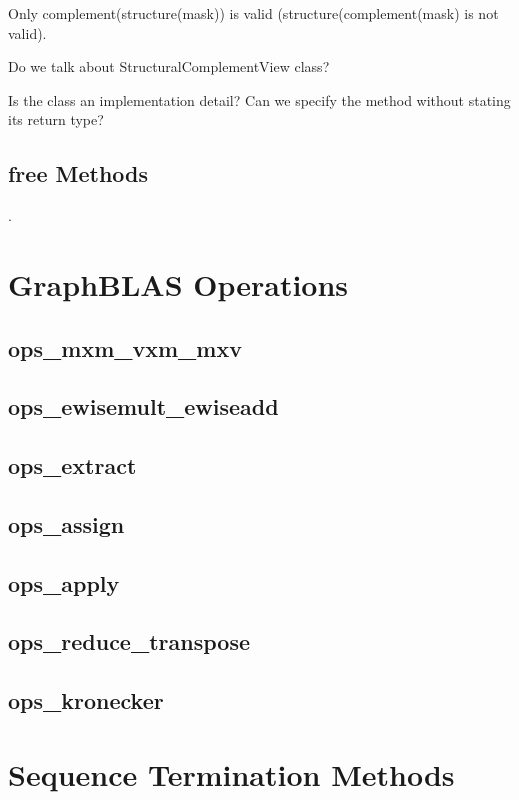 Only complement(structure(mask)) is valid  (structure(complement(mask) is not valid).

Do we talk about StructuralComplementView class?

Is the class an implementation detail?  Can we specify the method without stating its return type?

\subsection{{\sf free} Methods}

.

\section{GraphBLAS Operations}

\subsection{ops\_mxm\_vxm\_mxv}
\subsection{ops\_ewisemult\_ewiseadd}
\subsection{ops\_extract}
\subsection{ops\_assign} 
\subsection{ops\_apply}
\subsection{ops\_reduce\_transpose}
\subsection{ops\_kronecker}

\section{Sequence Termination Methods}